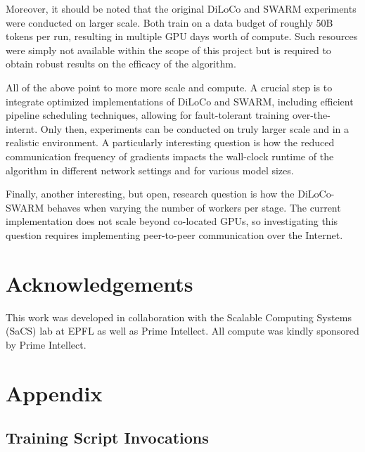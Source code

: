 \documentclass{article}
\begin{document}
Moreover, it should be noted that the original DiLoCo and SWARM experiments were
conducted on larger scale. Both train on a data budget of roughly 50B tokens per
run, resulting in multiple GPU days worth of compute. Such resources were simply
not available within the scope of this project but is required to obtain robust
results on the efficacy of the algorithm.

All of the above point to more more scale and compute. A crucial step is to
integrate optimized implementations of DiLoCo and SWARM, including efficient
pipeline scheduling techniques, allowing for fault-tolerant training over-the-
internt. Only then, experiments can be conducted on truly larger scale and in a
realistic environment. A particularly interesting question is how the reduced
communication frequency of gradients impacts the wall-clock runtime of the
algorithm in different network settings and for various model sizes.

Finally, another interesting, but open, research question is how the
DiLoCo-SWARM behaves when varying the number of workers per stage. The current
implementation does not scale beyond co-located GPUs, so investigating this
question requires implementing peer-to-peer communication over the Internet.

\section*{Acknowledgements}
\label{sec:acknowledgements}

This work was developed in collaboration with the Scalable Computing Systems
(SaCS) lab at EPFL as well as Prime Intellect. All compute was kindly sponsored
by Prime Intellect.




\newpage
\appendix
\onecolumn

\section{Appendix}


\subsection{Training Script Invocations}
\end{document}
